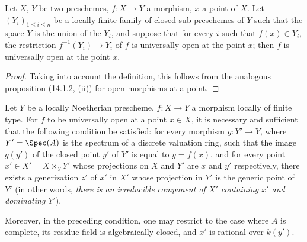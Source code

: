 \begin{proposition}[14.3.5]
\label{IV.14.3.5}
Let $X$, $Y$ be two preschemes, $f:X\to Y$ a morphism, $x$ a point of $X$.
Let $(Y_i)_{1\leq i\leq n}$ be a locally finite family of closed sub-preschemes of $Y$ such that the space $Y$ is the union of the $Y_i$, and suppose that for every $i$ such that $f(x)\in Y_i$, the restriction $f^{-1}(Y_i)\to Y_i$ of $f$ is universally open at the point $x$; then $f$ is universally open at the point $x$.
\end{proposition}

\begin{proof}
Taking into account the definition, this follows from the analogous proposition \hyperref[IV.14.1.2]{(14.1.2, (ii))} for open morphisms at a point.
\end{proof}

\begin{proposition}[14.3.6]
\label{IV.14.3.6}
Let $Y$ be a locally Noetherian prescheme, $f:X\to Y$ a morphism locally of finite type.
For $f$ to be universally open at a point $x\in X$, it is necessary and sufficient that the following condition be satisfied: for every morphism $g:Y'\to Y$, where $Y'=\Spec(A)$ is the spectrum of a discrete valuation ring, such that the image $g(y')$ of the closed point $y'$ of $Y'$ is equal to $y=f(x)$, and for every point $x'\in X'=X\times_Y Y'$ whose projections on $X$ and $Y'$ are $x$ and $y'$ respectively, there exists a generization $z'$ of $x'$ in $X'$ whose projection in $Y'$ is the generic point of $Y'$ (in other words, \emph{there is an irreducible component of $X'$ containing $x'$ and dominating $Y'$}).


Moreover, in the preceding condition, one may restrict to the case where $A$ is complete, its residue field is algebraically closed, and $x'$ is rational over $k(y')$.
\end{proposition}

